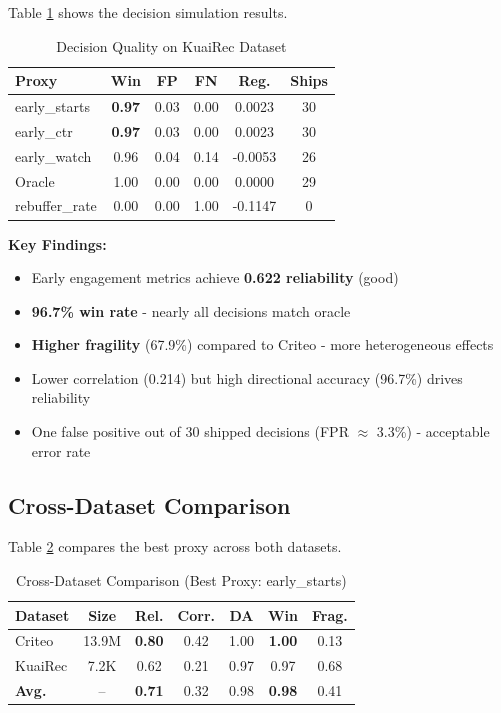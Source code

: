 \documentclass[11pt,twocolumn]{article}
\begin{document}
Table \ref{tab:kuairec_decisions} shows the decision simulation results.

\begin{table}[H]
\centering
\caption{Decision Quality on KuaiRec Dataset}
\label{tab:kuairec_decisions}
\small
\begin{tabular}{@{}lccccc@{}}
\toprule
\textbf{Proxy} & \textbf{Win} & \textbf{FP} & \textbf{FN} & \textbf{Reg.} & \textbf{Ships} \\
\midrule
early\_starts & \textbf{0.97} & 0.03 & 0.00 & 0.0023 & 30 \\
early\_ctr & \textbf{0.97} & 0.03 & 0.00 & 0.0023 & 30 \\
early\_watch & 0.96 & 0.04 & 0.14 & -0.0053 & 26 \\
Oracle & 1.00 & 0.00 & 0.00 & 0.0000 & 29 \\
rebuffer\_rate & 0.00 & 0.00 & 1.00 & -0.1147 & 0 \\
\bottomrule
\end{tabular}
\end{table}

\textbf{Key Findings:}
\begin{itemize}
    \item Early engagement metrics achieve \textbf{0.622 reliability} (good)
    \item \textbf{96.7\% win rate} - nearly all decisions match oracle
    \item \textbf{Higher fragility} (67.9\%) compared to Criteo - more heterogeneous effects
    \item Lower correlation (0.214) but high directional accuracy (96.7\%) drives reliability
    \item One false positive out of 30 shipped decisions (FPR $\approx$ 3.3\%) - acceptable error rate
\end{itemize}

\subsection{Cross-Dataset Comparison}

Table \ref{tab:comparison} compares the best proxy across both datasets.

\begin{table}[H]
\centering
\caption{Cross-Dataset Comparison (Best Proxy: early\_starts)}
\label{tab:comparison}
\small
\begin{tabular}{@{}lcccccc@{}}
\toprule
\textbf{Dataset} & \textbf{Size} & \textbf{Rel.} & \textbf{Corr.} & \textbf{DA} & \textbf{Win} & \textbf{Frag.} \\
\midrule
Criteo & 13.9M & \textbf{0.80} & 0.42 & 1.00 & \textbf{1.00} & 0.13 \\
KuaiRec & 7.2K & 0.62 & 0.21 & 0.97 & 0.97 & 0.68 \\
\midrule
\textbf{Avg.} & -- & \textbf{0.71} & 0.32 & 0.98 & \textbf{0.98} & 0.41 \\
\bottomrule
\end{tabular}
\end{table}
\end{document}

